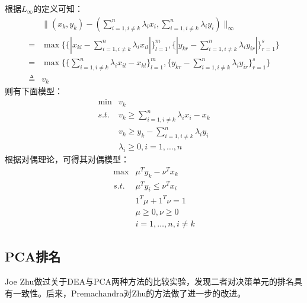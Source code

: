 根据$L_{\infty}$的定义可知：
\begin{equation}\label{eq:infinitynorm}
  \begin{array}{ll}
     & \|(x_k,y_k) - (\sum\limits_{i=1, i \ne k}^n \lambda_i x_i,\sum\limits_{i=1, i \ne k}^n \lambda_i y_i)\|_{\infty} \\
     = & \max\bigg\{\big\{|x_{kl} - \sum\limits_{i = 1, i\ne k}^n \lambda_i x_{il}|\big\}_{l=1}^m,\big\{|y_{kr} - \sum\limits_{i = 1, i\ne k}^n \lambda_i y_{ir}|\big\}_{r=1}^s\bigg\} \\
     = & \max\bigg\{\big\{\sum\limits_{i = 1, i\ne k}^n \lambda_i x_{il} - x_{kl}\big\}_{l=1}^m,\big\{y_{kr} - \sum\limits_{i = 1, i\ne k}^n \lambda_i y_{ir}\big\}_{r=1}^s\bigg\}\\
     \triangleq & v_k
  \end{array}
\end{equation}
则有下面模型：
\begin{equation}
  \begin{array}{ll}
    \min & v_k \\
    \textit{s.t.} & v_k \ge \sum\limits_{i=1, i \ne k}^n \lambda_i x_i - x_k\\
    & v_k \ge y_k - \sum\limits_{i=1, i \ne k}^n \lambda_i y_i\\
    & \lambda_i \ge 0, i =1,\ldots, n
  \end{array}
\end{equation}
根据对偶理论，可得其对偶模型：
\begin{equation}
  \begin{array}{ll}
    \max & \mu^T y_k - \nu^T x_k\\
    \textit{s.t.} & \mu^T y_i \le \nu^T x_i\\
    & 1^T \mu + 1^T \nu = 1\\
    &\mu \ge 0, \nu \ge 0\\
    & i = 1,\ldots, n, i \ne k
  \end{array}
\end{equation}

\subsection{PCA排名}
Joe Zhu\cite{zhu1998data}做过关于DEA与PCA两种方法的比较实验，发现二者对决策单元的排名具有一致性。后来，Premachandra\cite{premachandra2001note}对Zhu的方法做了进一步的改进。